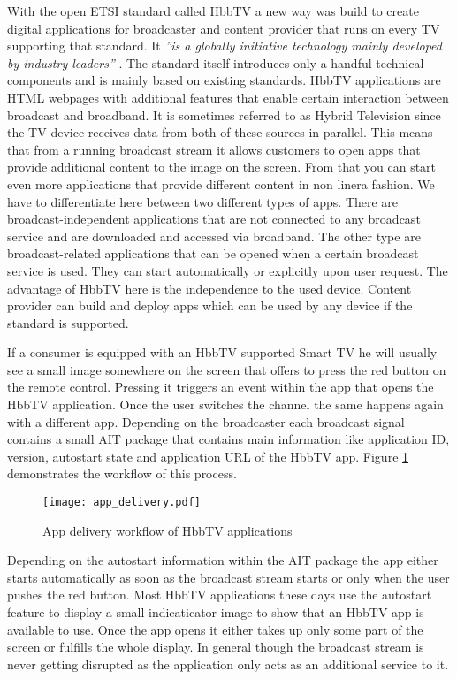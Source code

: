 With the open ETSI standard called HbbTV a new way was build to create digital applications for
broadcaster and content provider that runs on every TV supporting that standard. It \textit{''is
a globally initiative technology mainly developed by industry leaders''} \cite{zte}. The standard
itself introduces only a handful technical components and is mainly based on existing standards. HbbTV
applications are HTML webpages with additional features that enable certain interaction between
broadcast and broadband. It is sometimes referred to as Hybrid Television since the TV device receives
data from both of these sources in parallel. This means that from a running broadcast stream it allows
customers to open apps that provide additional content to the image on the screen. From that you can start
even more applications that provide different content in non linera fashion. We have to differentiate
here between two different types of apps. There are broadcast-independent applications that are not
connected to any broadcast service and are downloaded and accessed via broadband. The other type are
broadcast-related applications that can be opened when a certain broadcast service is used. They
can start automatically or explicitly upon user request. The advantage of HbbTV here is the independence
to the used device. Content provider can build and deploy apps which can be used by any device if the
standard is supported.

If a consumer is equipped with an HbbTV supported Smart TV he will usually see a small image somewhere
on the screen that offers to press the red button on the remote control. Pressing it triggers an
event within the app that opens the HbbTV application. Once the user switches the channel the same
happens again with a different app. Depending on the broadcaster each broadcast signal contains
a small AIT package that contains main information like application ID, version, autostart state and
application URL of the HbbTV app. Figure \ref{fig:app_delivery} demonstrates the workflow of this
process.

\begin{figure}[htb]
  \centering
  \texttt{[image: app\_delivery.pdf]}\\
  \caption{App delivery workflow of HbbTV applications}\label{fig:app_delivery}
\end{figure}

Depending on the autostart information within the AIT package the app either starts automatically
as soon as the broadcast stream starts or only when the user pushes the red button. Most HbbTV
applications these days use the autostart feature to display a small indicaticator image to
show that an HbbTV app is available to use. Once the app opens it either takes up only some part
of the screen or fulfills the whole display. In general though the broadcast stream is never
getting disrupted as the application only acts as an additional service to it.

